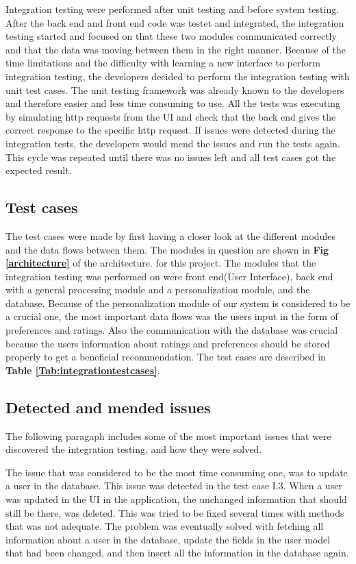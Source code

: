 Integration testing were performed after unit testing and before system testing. After the back end and front end code was testet and integrated, the integration testing started and focused on that these two modules communicated correctly and that the data was moving between them in the right manner. 
Because of the time limitations and the difficulty with learning a new interface to perform integration testing, the developers decided to perform the integration testing with unit test cases. The unit testing framework was already known to the developers and therefore easier and less time consuming to use. All the tests was executing by simulating http requests from the UI and check that the back end gives the correct response to the specific http request. 
If issues were detected during the integration tests, the developers would mend the issues and run the tests again. This cycle was repeated until there was no issues left and all test cases got the expected result. \newline


\subsection{Test cases}
The test cases were made by first having a closer look at the different modules and the data flows between them. The modules in question are shown in \textbf{Fig \ref{architecture}} of the architecture. for this project. The modules that the integration testing was performed on were front end(User Interface), back end with a general processing module and a personalization module, and the database. Because of the personalization module of our system is considered to be a crucial one, the most important data flows was the users input in the form of preferences and ratings. Also the communication with the database was crucial because the users information about ratings and preferences should be stored properly to get a beneficial recommendation. The test cases are described in \textbf{Table \ref{Tab:integrationtestcases}}.


\subsection{Detected and mended issues}

The following paragaph includes some of the most important issues that were discovered the integration testing, and how they were solved.

The issue that was considered to be the most time consuming one, was to update a user in the database. This issue was detected in the test case I.3. When a user was updated in the UI in the application, the unchanged information that should still be there, was deleted. This was tried to be fixed several times with methods that was not adequate. The problem was eventually solved with fetching all information about a user in the database, update the fields in the user model that had been changed, and then insert all the information in the database again. \newline

